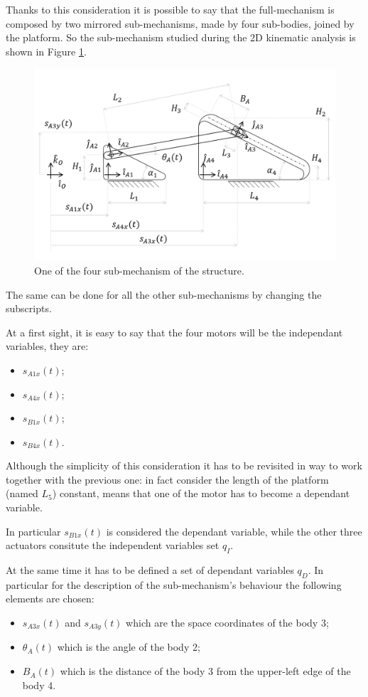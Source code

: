 \documentclass[10.5pt, twocolumn]{article}
\begin{document}
Thanks to this consideration it is possible to say that the full-mechanism is composed by two mirrored sub-mechanisms, made by four sub-bodies, joined by the platform.
So the sub-mechanism studied during the 2D kinematic analysis is shown in Figure \ref{f:Sub-Mechanism}.
\begin{figure}[h!]
	\centering
	\includegraphics[width=12cm]{Images/Sub-Mechanism}
	\caption{One of the four sub-mechanism of the structure.}
	\label{f:Sub-Mechanism}
\end{figure}
The same can be done for all the other sub-mechanisms by changing the subscripts.

At a first sight, it is easy to say that the four motors will be the independant variables, they are:
\begin{itemize}
  \item \( s_{A1x}(t) \);
  \item \( s_{A4x}(t) \);
  \item \( s_{B1x}(t) \);
  \item \( s_{B4x}(t) \).
\end{itemize}
Although the simplicity of this consideration it has to be revisited in way to work together with the previous one: in fact consider the length of the platform (named \( L_5\)) constant, means that one of the motor has to become a dependant variable.

In particular \( s_{B1x}(t) \) is considered the dependant variable, while the other three actuators consitute the independent variables set \( q_{I} \).

At the same time it has to be defined a set of dependant variables \( q_{D} \).
In particular for the description of the sub-mechanism's behaviour the following elements are chosen:
\begin{itemize}
  \item \( s_{A3x}(t) \) and \( s_{A3y}(t) \) which are the space coordinates of the body 3;
  \item \( \theta_A(t) \) which is the angle of the body 2;
  \item \( B_A(t) \) which is the distance of the body 3 from the upper-left edge of the body 4.
\end{itemize}
\end{document}
